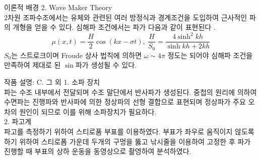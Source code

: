 \documentclass[a0paper,portrait]{Junlam_PosterP}
\begin{document}
\begin{poster}
\begin{posterbox}[name=theo,column=0,below=intro]{이론적 배경}
   \small {2. Wave Maker Theory\\}
     \scriptsize 2차원 조파수조에서는 유체와 관련된 여러 방정식과 경계조건을 도입하여 근사적인 파의 개형을 얻을 수 있다. 심해파 조건에서는 파가 다음과 같이 표현된다 \cite{ART002413750, ART002785404, dean1991water}.
      \begin{equation*}
         \mu(x,t)=\frac{H}{2}\cos(kx-\sigma t),~\frac{H}{S_0}=\frac{4\sinh^2 kh}{\sinh kh + 2kh}
      \end{equation*}
         $S_0$는 스트로크이며 Froude 상사 법칙에 의하면 $\omega \sim 4\pi$ 정도는 되어야 심해파 조건을 만족하여 제대로 된 $\sin$파가 생성될 수 있다.
\end{posterbox}

\begin{posterbox}[name=wmaker,column=0,below=theo, above=bottom] {작품 설명: C. 그 외}
\small {1. 소파 장치\\}
    \scriptsize {파는 수조 내부에서 전달되며 수조 말단에서 반사파가 생성된다. 중첩의 원리에 의하여 수면파는 진행파와 반사파에 의한 정상파의 선형 결합으로 표현되며 정상파가 주요 오차의 원인이 되므로 이를 위해 소파장치가 필요하다.}\\

\small{2. 파고계\\}
    \scriptsize {파고를 측정하기 위하여 스티로품 부표를 이용하였다. 부표가 좌우로 움직이지 않도록 하기 위하여 스티로폼 가운데 두개의 구멍을 뚫고 낚시줄을 이용하여 고정한 후 파가 진행할 때 부표의 상하 운동을 동영상으로 촬영하여 분석하였다.}
    

\end{posterbox}
\end{poster}
\end{document}
